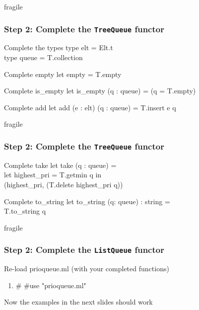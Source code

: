 \documentclass{beamer}
\begin{document}
\begin{frame}{fragile}
\frametitle{Step 2: Complete the {\tt TreeQueue} functor}


\begin{block}{Complete the types}
\hspace*{1.0in}type elt = Elt.t \\
\hspace*{1.0in}type queue = T.collection
\end{block}

\begin{block}{Complete empty}
\hspace*{1.0in}let empty = T.empty
\end{block}

\begin{block}{Complete is\_empty}
\hspace*{1.0in}let is\_empty (q : queue) = (q = T.empty)
\end{block}

\begin{block}{Complete add}
\hspace*{1.0in}let add (e : elt) (q : queue) = T.insert e q
\end{block}

\end{frame}




\begin{frame}{fragile}
\frametitle{Step 2: Complete the {\tt TreeQueue} functor}

\begin{block}{Complete take}
\hspace*{1.0in}let take (q : queue) =\\
\hspace*{1.15in}      let highest\_pri = T.getmin q in \\
\hspace*{1.15in}      (highest\_pri, (T.delete highest\_pri q))
\end{block}

\begin{block}{Complete to\_string}
\hspace*{1.0in}let to\_string (q: queue) : string = \\
\hspace*{1.15in}      T.to\_string q
\end{block}

\end{frame}


\begin{frame}{fragile}
\frametitle{Step 2: Complete the {\tt ListQueue} functor}

\begin{block}{Re-load prioqueue.ml (with your completed functions)}
\begin{enumerate}
\item \# \#use "prioqueue.ml"
\end{enumerate}
\end{block}

\begin{example}
Now the examples in the next slides should work
\end{example}
\end{frame}
      
\end{document}
